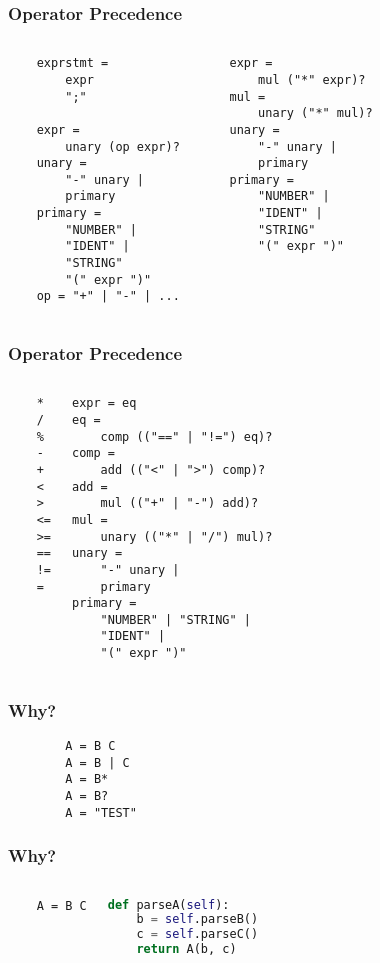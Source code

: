 \documentclass{beamer}
\begin{document}
    \begin{frame}[fragile]
        \frametitle{Operator Precedence}
        \begin{columns}
        \begin{verbatim}
    exprstmt = 
        expr
        ";"
    
    expr = 
        unary (op expr)?
    unary = 
        "-" unary |
        primary
    primary =
        "NUMBER" |
        "IDENT" | 
        "STRING"
        "(" expr ")"
    op = "+" | "-" | ...
                \end{verbatim}
        \pause
        \begin{verbatim}
    expr = 
        mul ("*" expr)?
    mul = 
        unary ("*" mul)?
    unary = 
        "-" unary |
        primary
    primary =
        "NUMBER" |
        "IDENT" | 
        "STRING"
        "(" expr ")"
        \end{verbatim}
        \end{columns}
    \end{frame}

    \begin{frame}[fragile]
        \frametitle{Operator Precedence}
        \begin{columns}
        \begin{verbatim}
    *
    /
    %
    -
    +
    <
    >
    <=
    >=
    ==
    !=
    =
        \end{verbatim}
        \pause
        \begin{verbatim}
expr = eq
eq = 
    comp (("==" | "!=") eq)?
comp = 
    add (("<" | ">") comp)?
add = 
    mul (("+" | "-") add)?
mul = 
    unary (("*" | "/") mul)?
unary = 
    "-" unary |
    primary
primary =
    "NUMBER" | "STRING" |
    "IDENT" | 
    "(" expr ")"
        \end{verbatim}
        \end{columns}
    \end{frame}

    \begin{frame}[fragile]
    \frametitle{Why?}
    \begin{verbatim}
        A = B C
        A = B | C
        A = B*
        A = B?
        A = "TEST"
    \end{verbatim}
    \end{frame}

    \begin{frame}[fragile]
    \frametitle{Why?}
    \begin{columns}
    \begin{verbatim}
    A = B C
    \end{verbatim}
    \pause
    \begin{lstlisting}[language=Python]
def parseA(self):
    b = self.parseB()
    c = self.parseC()
    return A(b, c)
        \end{lstlisting}
    \end{columns}
    \end{frame}
\end{document}
